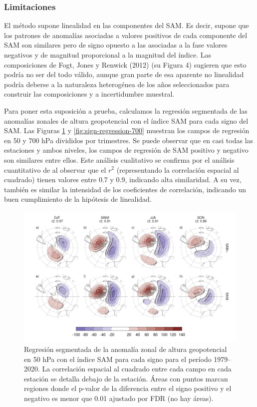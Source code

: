 \documentclass[12pt,oneside,a4paper]{reedthesis}
\begin{document}
\hypertarget{limitaciones}{%
\subsubsection{Limitaciones}\label{limitaciones}}

El método supone linealidad en las componentes del SAM.
Es decir, supone que los patrones de anomalías asociadas a valores positivos de cada componente del SAM son similares pero de signo opuesto a las asociadas a la fase valores negativos y de magnitud proporcional a la magnitud del índice.
Las composiciones de Fogt, Jones y Renwick (2012) (su Figura 4) sugieren que esto podría no ser del todo válido, aunque gran parte de esa aparente no linealidad podría deberse a la naturaleza heterogénea de los años seleccionados para construir las composiciones y a incertidumbre muestral.

Para poner esta suposición a prueba, calculamos la regresión segmentada de las anomalías zonales de altura geopotencial con el índice SAM para cada signo del SAM.
Las Figuras \ref{fig:sign-regression-50} y \ref{fig:sign-regression-700} muestran los campos de regresión en 50 y 700 hPa divididos por trimestres.
Se puede observar que en casi todas las estaciones y ambos niveles, los campos de regresión de SAM positivo y negativo son similares entre ellos.
Este análisis cualitativo se confirma por el análisis cuantitativo de al observar que el \(r^2\) (representando la correlación espacial al cuadrado) tienen valores entre 0.7 y 0.9, indicando alta similaridad.
A su vez, también es similar la intensidad de los coeficientes de correlación, indicando un buen cumplimiento de la hipótesis de linealidad.



\begin{figure}

{\centering \includegraphics{figures/30-sam/sign-regression-50-1} 

}

\caption{Regresión segmentada de la anomalía zonal de altura geopotencial en 50 hPa con el índice SAM para cada signo para el período 1979--2020. La correlación espacial al cuadrado entre cada campo en cada estación se detalla debajo de la estación. Áreas con puntos marcan regiones donde el p-valor de la diferencia entre el signo positivo y el negativo es menor que 0.01 ajustado por FDR (no hay áreas).}\label{fig:sign-regression-50}
\end{figure}
\end{document}
